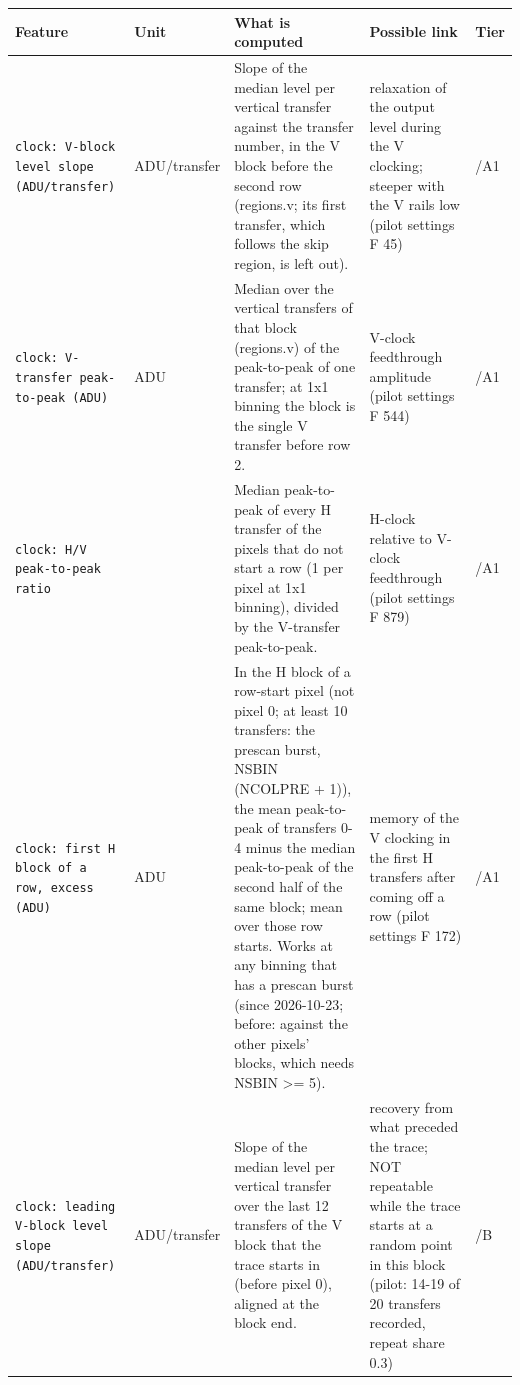\documentclass[10pt]{article}
\renewcommand{\_}{\oldunderscore\allowbreak}
\begin{document}
\begin{longtable}{>{\raggedright\arraybackslash}p{}>{\raggedright\arraybackslash}p{}>{\raggedright\arraybackslash}p{}>{\raggedright\arraybackslash}p{}>{\raggedright\arraybackslash}p{}}
\toprule Feature & Unit & What is computed & Possible link & Tier \\ \midrule \endhead
\bottomrule \endfoot
\texttt{clock: V-block level slope (ADU/transfer)} & ADU/\allowbreak{}transfer & Slope of the median level per vertical transfer against the transfer number, in the V block before the second row (regions.v; its first transfer, which follows the skip region, is left out). & relaxation of the output level during the V clocking; steeper with the V rails low (pilot settings F 45) & 1/A1 \\
\texttt{clock: V-transfer peak-to-peak (ADU)} & ADU & Median over the vertical transfers of that block (regions.v) of the peak-to-peak of one transfer; at 1x1 binning the block is the single V transfer before row 2. & V-clock feedthrough amplitude (pilot settings F 544) & 1/A1 \\
\texttt{clock: H/V peak-to-peak ratio} &  & Median peak-to-peak of every H transfer of the pixels that do not start a row (1 per pixel at 1x1 binning), divided by the V-transfer peak-to-peak. & H-clock relative to V-clock feedthrough (pilot settings F 879) & 1/A1 \\
\texttt{clock: first H block of a row, excess (ADU)} & ADU & In the H block of a row-start pixel (not pixel 0; at least 10 transfers: the prescan burst, NSBIN (NCOLPRE + 1)), the mean peak-to-peak of transfers 0-4 minus the median peak-to-peak of the second half of the same block; mean over those row starts. Works at any binning that has a prescan burst (since 2026-10-23; before: against the other pixels' blocks, which needs NSBIN \textgreater{}= 5). & memory of the V clocking in the first H transfers after coming off a row (pilot settings F 172) & 1/A1 \\
\texttt{clock: leading V-block level slope (ADU/transfer)} & ADU/\allowbreak{}transfer & Slope of the median level per vertical transfer over the last 12 transfers of the V block that the trace starts in (before pixel 0), aligned at the block end. & recovery from what preceded the trace; NOT repeatable while the trace starts at a random point in this block (pilot: 14-19 of 20 transfers recorded, repeat share 0.3) & 2/B \\
\end{longtable}
\end{document}

